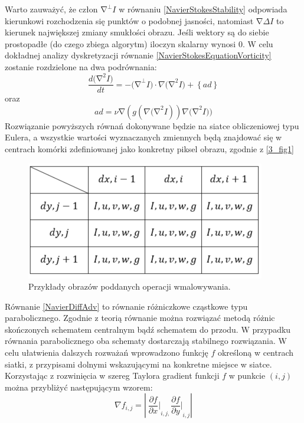 \documentclass[12pt, twoside, openany]{report}
\theoremstyle{definition}
\begin{document}
Warto zauważyć, że człon ${\mathrm{\nabla }}^{\bot }I$ w równaniu \eqref{NavierStokesStability} odpowiada kierunkowi rozchodzenia się punktów o podobnej jasności, natomiast $\mathrm{\nabla }\Delta I$ to kierunek największej zmiany smukłości obrazu. Jeśli wektory są do siebie prostopadłe (do czego zbiega algorytm) iloczyn skalarny wynosi 0. 
W celu dokładnej analizy dyskretyzacji równanie \eqref{NavierStokesEquationVorticity} zostanie rozdzielone na dwa podrównania:
\begin{equation}
\frac{d{\mathrm{(}\mathrm{\nabla }}^2I)}{dt}=-{\mathrm{(}\mathrm{\nabla }}^{\bot }I)\cdot \nabla {\mathrm{(}\mathrm{\nabla }}^2I)+\left\{ad\right\}
\label{NavierDiffAdv}
\end{equation}
oraz
\begin{equation}
ad=\nu \mathrm{\nabla }(g(\nabla {\mathrm{(}\mathrm{\nabla }}^2I))\nabla {\mathrm{(}\mathrm{\nabla }}^2I))
\label{NavierAdv}
\end{equation}
Rozwiązanie powyższych równań dokonywane będzie na siatce obliczeniowej typu Eulera, a wszystkie wartości wyznaczanych zmiennych będą znajdować się w centrach komórki zdefiniowanej jako konkretny piksel obrazu, zgodnie z \autoref{3_fig1} 
\begin{figure}[!h]
	\centering
	\includegraphics[scale=0.7]{rysunki/fig2}
	\caption{Przykłady obrazów poddanych operacji wmalowywania.}
	\label{3_fig2}
\end{figure}
Równanie \eqref{NavierDiffAdv} to równanie różniczkowe cząstkowe typu parabolicznego. Zgodnie z teorią równanie można rozwiązać metodą różnic skończonych schematem centralnym bądź schematem do przodu. W przypadku równania parabolicznego oba schematy dostarczają stabilnego rozwiązania. W celu ułatwienia dalszych rozważań wprowadzono funkcję $f$ określoną w centrach siatki, z przypisami dolnymi wskazującymi na konkretne miejsce w siatce. Korzystając z rozwinięcia w szereg Taylora gradient funkcji $f$ w punkcie $(i,j)$  można przybliżyć następującym wzorem:
\begin{equation}
\nabla f_{i,j}=\left|\ {\frac{\partial f}{\partial x}|}_{i,j,}{\frac{\partial f}{\partial y}|}_{i,j}\right|
\label{gradF}
\end{equation}
\end{document}
